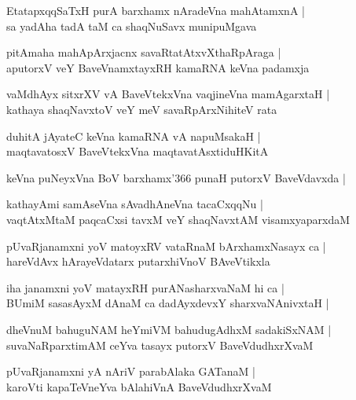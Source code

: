 \begin{shloka}
EtatapxqqSaTxH purA barxhamx nAradeVna mahAtamxnA |\\
sa yadAha tadA taM ca shaqNuSavx munipuMgava
\end{shloka}

\begin{shloka}
pitAmaha mahApArxjacnx savaRtatAtxvXthaRpAraga |\\
aputorxV veY BaveVnamxtayxRH kamaRNA keVna padamxja
\end{shloka}

\begin{shloka}
vaMdhAyx sitxrXV vA BaveVtekxVna vaqjineVna mamAgarxtaH |\\
kathaya shaqNavxtoV veY meV savaRpArxNihiteV rata
\end{shloka}

\begin{shloka}
duhitA jAyateC keVna kamaRNA vA napuMsakaH |\\
maqtavatosxV BaveVtekxVna maqtavatAsxtiduHKitA
\end{shloka}
keVna puNeyxVna BoV barxhamx\char'366 punaH putorxV BaveVdavxda |

\begin{shloka}
kathayAmi samAseVna sAvadhAneVna tacaCxqqNu |\\
vaqtAtxMtaM paqcaCxsi tavxM veY shaqNavxtAM visamxyaparxdaM
\end{shloka}

\begin{shloka}
pUvaRjanamxni yoV matoyxRV vataRnaM bArxhamxNasayx ca |\\
hareVdAvx hArayeVdatarx putarxhiVnoV BAveVtikxla 
\end{shloka}

\begin{shloka}
iha janamxni yoV matayxRH purANasharxvaNaM hi ca |\\
BUmiM sasasAyxM dAnaM ca dadAyxdevxY sharxvaNAnivxtaH |
\end{shloka}

\begin{shloka}
dheVnuM bahuguNAM heYmiVM bahudugAdhxM sadakiSxNAM |\\
suvaNaRparxtimAM ceYva tasayx putorxV BaveVdudhxrXvaM
\end{shloka}

\begin{shloka}
pUvaRjanamxni yA nAriV parabAlaka GATanaM |\\
karoVti kapaTeVneYva bAlahiVnA BaveVdudhxrXvaM
\end{shloka}

